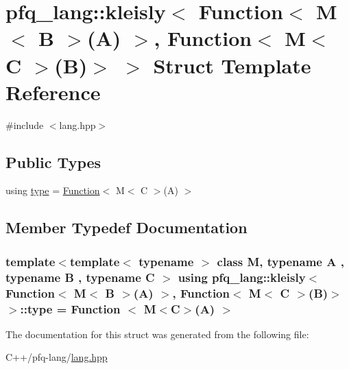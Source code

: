 \hypertarget{structpfq__lang_1_1kleisly_3_01Function_3_01M_3_01B_01_4_07A_08_01_4_00_01Function_3_01M_3_01C_01_4_07B_08_4_01_4}{\section{pfq\+\_\+lang\+:\+:kleisly$<$ Function$<$ M$<$ B $>$(A) $>$, Function$<$ M$<$ C $>$(B)$>$ $>$ Struct Template Reference}
\label{structpfq__lang_1_1kleisly_3_01Function_3_01M_3_01B_01_4_07A_08_01_4_00_01Function_3_01M_3_01C_01_4_07B_08_4_01_4}
}


{\ttfamily \#include $<$lang.\+hpp$>$}

\subsection*{Public Types}
\begin{DoxyCompactItemize}
\item 
using \hyperlink{structpfq__lang_1_1kleisly_3_01Function_3_01M_3_01B_01_4_07A_08_01_4_00_01Function_3_01M_3_01C_01_4_07B_08_4_01_4_a9a202c30484a455c38a3632c5eee4c47}{type} = \hyperlink{structpfq__lang_1_1Function}{Function}$<$ M$<$ C $>$(A) $>$
\end{DoxyCompactItemize}


\subsection{Member Typedef Documentation}
\hypertarget{structpfq__lang_1_1kleisly_3_01Function_3_01M_3_01B_01_4_07A_08_01_4_00_01Function_3_01M_3_01C_01_4_07B_08_4_01_4_a9a202c30484a455c38a3632c5eee4c47}{
\subsubsection[{type}]{\setlength{\rightskip}{0pt plus 5cm}template$<$template$<$ typename $>$ class M, typename A , typename B , typename C $>$ using {\bf pfq\+\_\+lang\+::kleisly}$<$ {\bf Function}$<$ M$<$ B $>$(A) $>$, {\bf Function}$<$ M$<$ C $>$(B)$>$ $>$\+::{\bf type} =  {\bf Function} $<$ M$<$C$>$(A) $>$}}\label{structpfq__lang_1_1kleisly_3_01Function_3_01M_3_01B_01_4_07A_08_01_4_00_01Function_3_01M_3_01C_01_4_07B_08_4_01_4_a9a202c30484a455c38a3632c5eee4c47}


The documentation for this struct was generated from the following file\+:\begin{DoxyCompactItemize}
\item 
C++/pfq-\/lang/\hyperlink{lang_8hpp}{lang.\+hpp}\end{DoxyCompactItemize}
